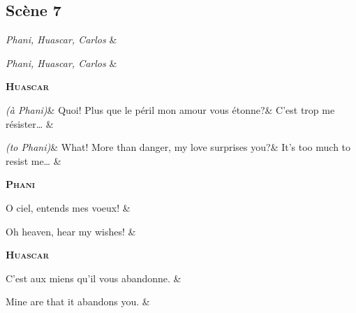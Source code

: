 \documentclass{article}
\newcommand{\dialogue}[1]{%
    \filbreak\begin{center}
	    \textbf{\textsc{#1}}
    \end{center}\nopagebreak}
\newcommand{\stage}[1]{\hfill\emph{(#1)}\hfill}
\newcommand{\scene}[1]{\emph{#1}\hfill}
\begin{document}
\subsection*{Sc\`{e}ne 7}

\begin{pairs}
\begin{Leftside}
	\stanza
		\scene{Phani, Huascar, Carlos}
    \& 
    \endnumbering
\end{Leftside}
\begin{Rightside}
	\stanza
		\scene{Phani, Huascar, Carlos}
    \& 
    \endnumbering
\end{Rightside} 
\Columns 
\end{pairs}

\dialogue{Huascar}
\begin{pairs}
\begin{Leftside}
	\stanza
		\stage{\`{a} Phani}&
		Quoi! Plus que le p\'{e}ril mon amour vous \'{e}tonne?&
		C'est trop me r\'{e}sister\ldots{}
    \& 
    \endnumbering
\end{Leftside}
\begin{Rightside}
	\stanza
		\stage{to Phani}&
		What! More than danger, my love surprises you?&
		It's too much to resist me\ldots{}
    \& 
    \endnumbering
\end{Rightside} 
\Columns 
\end{pairs}

\dialogue{Phani}
\begin{pairs}
\begin{Leftside}
	\stanza
		O ciel, entends mes voeux!
    \& 
    \endnumbering
\end{Leftside}
\begin{Rightside}
	\stanza
		Oh heaven, hear my wishes!
    \& 
    \endnumbering
\end{Rightside} 
\Columns 
\end{pairs}

\dialogue{Huascar}
\begin{pairs}
\begin{Leftside}
	\stanza
		C'est aux miens qu'il vous abandonne.
    \& 
    \endnumbering
\end{Leftside}
\begin{Rightside}
	\stanza
		Mine are that it abandons you.
    \& 
    \endnumbering
\end{Rightside} 
\Columns 
\end{pairs}
\end{document}
